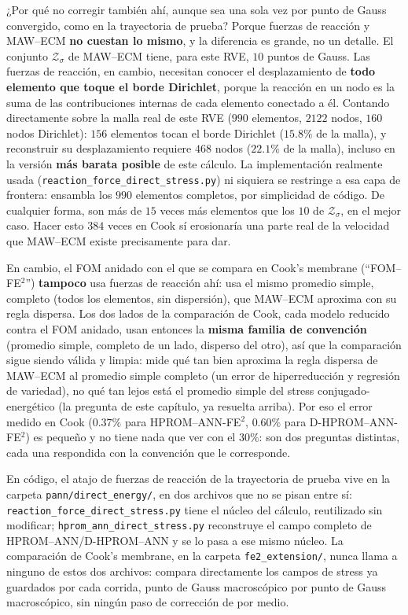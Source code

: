 \documentclass[11pt,a4paper]{article}
\begin{document}
¿Por qu\'e no corregir tambi\'en ah\'i, aunque sea una sola vez por
punto de Gauss convergido, como en la trayectoria de prueba? Porque
fuerzas de reacci\'on y MAW--ECM \textbf{no cuestan lo mismo}, y la
diferencia es grande, no un detalle. El conjunto $\mathcal Z_\sigma$
de MAW--ECM tiene, para este RVE, $10$ puntos de Gauss. Las fuerzas de
reacci\'on, en cambio, necesitan conocer el desplazamiento de
\textbf{todo elemento que toque el borde Dirichlet}, porque la
reacci\'on en un nodo es la suma de las contribuciones internas de
cada elemento conectado a \'el. Contando directamente sobre la malla
real de este RVE ($990$ elementos, $2122$ nodos, $160$ nodos
Dirichlet): $156$ elementos tocan el borde Dirichlet
($15.8\%$ de la malla), y reconstruir su desplazamiento requiere
$468$ nodos ($22.1\%$ de la malla), incluso en la versi\'on
\textbf{m\'as barata posible} de este c\'alculo. La implementaci\'on
realmente usada (\texttt{reaction\_force\_direct\_stress.py}) ni
siquiera se restringe a esa capa de frontera: ensambla los $990$
elementos completos, por simplicidad de c\'odigo. De cualquier forma,
son m\'as de $15$ veces m\'as elementos que los $10$ de $\mathcal
Z_\sigma$, en el mejor caso. Hacer esto $384$ veces en Cook s\'i
erosionar\'ia una parte real de la velocidad que MAW--ECM existe
precisamente para dar.

En cambio, el FOM anidado con el que se compara en Cook's membrane
(``FOM--FE$^2$'') \textbf{tampoco} usa fuerzas de reacci\'on ah\'i:
usa el mismo promedio simple, completo (todos los elementos, sin
dispersi\'on), que MAW--ECM aproxima con su regla dispersa. Los dos
lados de la comparaci\'on de Cook, cada modelo reducido contra el FOM
anidado, usan entonces la \textbf{misma familia de convenci\'on}
(promedio simple, completo de un lado, disperso del otro), as\'i que
la comparaci\'on sigue siendo v\'alida y limpia: mide qu\'e tan bien
aproxima la regla dispersa de MAW--ECM al promedio simple completo
(un error de hiperreducci\'on y regresi\'on de variedad), no qu\'e tan
lejos est\'a el promedio simple del stress conjugado-energ\'etico (la
pregunta de este cap\'itulo, ya resuelta arriba). Por eso el error
medido en Cook ($0.37\%$ para HPROM--ANN-FE$^2$, $0.60\%$ para
D-HPROM--ANN-FE$^2$) es peque\~no y no tiene nada que ver con el
$30\%$: son dos preguntas distintas, cada una respondida con la
convenci\'on que le corresponde.

En c\'odigo, el atajo de fuerzas de reacci\'on de la trayectoria de
prueba vive en la carpeta \texttt{pann/direct\_energy/}, en dos
archivos que no se pisan entre s\'i: \texttt{reaction\_force\_direct\_stress.py}
tiene el n\'ucleo del c\'alculo, reutilizado sin modificar;
\texttt{hprom\_ann\_direct\_stress.py} reconstruye el campo completo de
HPROM--ANN/D-HPROM--ANN y se lo pasa a ese mismo n\'ucleo. La
comparaci\'on de Cook's membrane, en la carpeta
\texttt{fe2\_extension/}, nunca llama a ninguno de estos dos archivos:
compara directamente los campos de stress ya guardados por cada
corrida, punto de Gauss macrosc\'opico por punto de Gauss
macrosc\'opico, sin ning\'un paso de correcci\'on de por medio.
\end{document}
